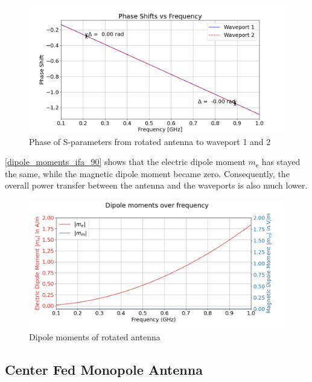 \begin{figure}[h]
    \centering
    \includegraphics[width=1\linewidth]{Documentation//content//30_simulations//img/phase_shift_90_ifa.png}
    \caption{Phase of S-parameters from rotated antenna to waveport 1 and 2}
    \label{fig:phase_shift_90_ifa}
\end{figure}

\autoref{dipole_moments_ifa_90} shows that the electric dipole moment $m_\mathrm{e}$ has stayed the same, while the magnetic dipole moment became zero. Consequently, the overall power transfer between the antenna and the waveports is also much lower. 


\begin{figure}[h]
    \centering
    \includegraphics[width=1\linewidth]{Documentation//content//30_simulations//img/dipole_moments_ifa_90.png}
    \caption{Dipole moments of rotated antenna}
    \label{fig:dipole_moments_ifa_90}
\end{figure}


\subsection{Center Fed Monopole Antenna}

